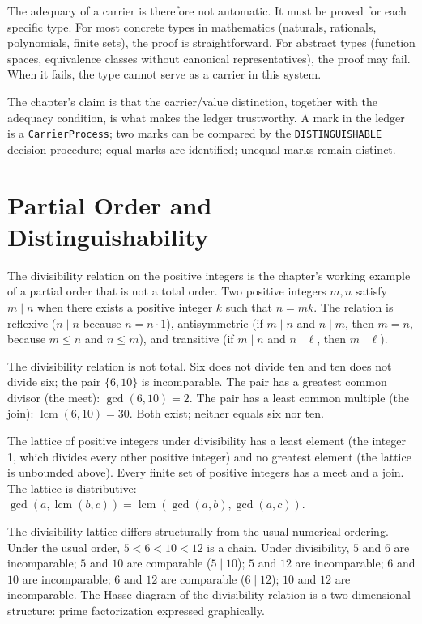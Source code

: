 The adequacy of a carrier is therefore not automatic. It must be proved
for each specific type. For most concrete types in mathematics
(naturals, rationals, polynomials, finite sets), the proof is straightforward.
For abstract types (function spaces, equivalence classes without canonical
representatives), the proof may fail. When it fails, the type cannot serve
as a carrier in this system.

The chapter's claim is that the carrier/value distinction, together with
the adequacy condition, is what makes the ledger trustworthy. A mark in
the ledger is a \texttt{CarrierProcess}; two marks can be compared by
the \texttt{DISTINGUISHABLE} decision procedure; equal marks are
identified; unequal marks remain distinct.

\section{Partial Order and Distinguishability}
\label{se:partial-order-and-distinguishability}

The divisibility relation on the positive integers is the chapter's
working example of a partial order that is not a total order. Two
positive integers $m, n$ satisfy $m \mid n$ when there exists a positive
integer $k$ such that $n = mk$. The relation is reflexive ($n \mid n$
because $n = n \cdot 1$), antisymmetric (if $m \mid n$ and $n \mid m$,
then $m = n$, because $m \le n$ and $n \le m$), and transitive (if
$m \mid n$ and $n \mid \ell$, then $m \mid \ell$).

The divisibility relation is not total. Six does not divide ten and ten
does not divide six; the pair $\{6, 10\}$ is incomparable. The pair has
a greatest common divisor (the meet): $\gcd(6, 10) = 2$. The pair has a
least common multiple (the join): $\operatorname{lcm}(6, 10) = 30$. Both
exist; neither equals six nor ten.

The lattice of positive integers under divisibility has a least element
(the integer 1, which divides every other positive integer) and no
greatest element (the lattice is unbounded above). Every finite set of
positive integers has a meet and a join. The lattice is distributive:
$\gcd(a, \operatorname{lcm}(b, c)) = \operatorname{lcm}(\gcd(a, b),
\gcd(a, c))$.

The divisibility lattice differs structurally from the usual numerical
ordering. Under the usual order, $5 < 6 < 10 < 12$ is a chain. Under
divisibility, $5$ and $6$ are incomparable; $5$ and $10$ are comparable
($5 \mid 10$); $5$ and $12$ are incomparable; $6$ and $10$ are
incomparable; $6$ and $12$ are comparable ($6 \mid 12$); $10$ and $12$
are incomparable. The Hasse diagram of the divisibility relation is a
two-dimensional structure: prime factorization expressed graphically.

